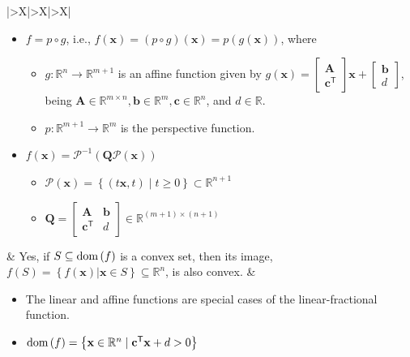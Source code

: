 \documentclass{article}
\newcommand{\dom}[1]{\ensuremath{\textnormal{dom}\left(#1\right)}} %
\begin{document}
\begin{xltabular}{\textwidth}{|>{\setlength\hsize{1\hsize}\setlength\linewidth{\hsize}}X|>{\setlength\hsize{.9\hsize}\setlength\linewidth{\hsize}}X|>{\setlength\hsize{1.1\hsize}\setlength\linewidth{\hsize}}X|}
\begin{itemize}[leftmargin=*]
        \item \(f = p \circ g\), i.e., \(f(\mathbf{x}) = (p\circ g)(\mathbf{x}) = p(g(\mathbf{x}))\), where
            \begin{itemize}[label={$\triangleright$}]
                \item \(g: \mathbb{R}^{n} \rightarrow \mathbb{R}^{m+1}\) is an affine function given by \(g(\mathbf{x}) = \begin{bmatrix}
                    \mathbf{A}\\
                    \mathbf{c}^\mathsf{T}
                \end{bmatrix} \mathbf{x} + \begin{bmatrix}
                    \mathbf{b} \\
                    d
                \end{bmatrix}\), being \(\mathbf{A}\in \mathbb{R}^{m \times n}, \mathbf{b} \in \mathbb{R}^{m}, \mathbf{c} \in \mathbb{R}^{n}\), and \(d \in \mathbb{R}\).
                \item \(p: \mathbb{R}^{m+1} \rightarrow \mathbb{R}^{m}\) is the perspective function.
            \end{itemize}
        \item \(f(\mathbf{x}) = \mathcal{P}^{-1}(\mathbf{Q}\mathcal{P}(\mathbf{x}))\)
            \begin{itemize}[label={$\triangleright$}]
                \item \(\mathcal{P}(\mathbf{x}) = \left\{ (t\mathbf{x}, t) \mid t \geq 0 \right\} \subset \mathbb{R}^{n+1}\)
                \item \(\mathbf{Q} = \begin{bmatrix}
                    \mathbf{A} & \mathbf{b} \\
                    \mathbf{c}^\mathsf{T} & d
                \end{bmatrix} \in \mathbb{R}^{(m+1)\times(n+1)}\)
            \end{itemize}
    \end{itemize} & Yes, if \(S \subseteq \dom{f}\) is a convex set, then its image, \(f(S) = \left\{ f(\mathbf{x})|\mathbf{x}\in S \right\} \subseteq \mathbb{R}^{n}\), is also convex. & \vspace{-3.5ex} \begin{itemize}[leftmargin=*]
        \item The linear and affine functions are special cases of the linear-fractional function.
        \item \(\dom{f} = \left\{ \mathbf{x} \in \mathbb{R}^{n} \mid \mathbf{c}^\mathsf{T} \mathbf{x} + d > 0 \right\}\)

\end{itemize}
\end{xltabular}
\end{document}
